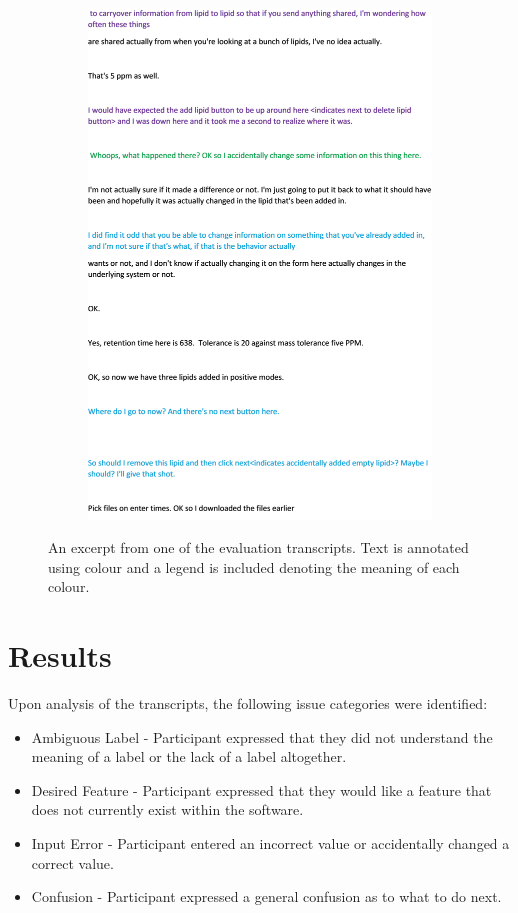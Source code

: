 \documentclass{l4proj}
\begin{document}
\begin{figure}
\begin{subfigure}{0.5\textwidth}
        \includegraphics[width=\textwidth]{dissertation/images/transcript_page_2.png}    
        
        \label{fig:final} 
    \end{subfigure}
    \caption{An excerpt from one of the evaluation transcripts. Text is annotated using colour and a legend is included denoting the meaning of each colour.}
\end{figure}

\section{Results}
Upon analysis of the transcripts, the following issue categories were identified:
\begin{itemize}
    \item Ambiguous Label - Participant expressed that they did not understand the meaning of a label or the lack of a label altogether.
    \item Desired Feature - Participant expressed that they would like a feature that does not currently exist within the software.
    \item Input Error - Participant entered an incorrect value or accidentally changed a correct value.
    \item Confusion - Participant expressed a general confusion as to what to do next.
\end{itemize}
\end{document}
